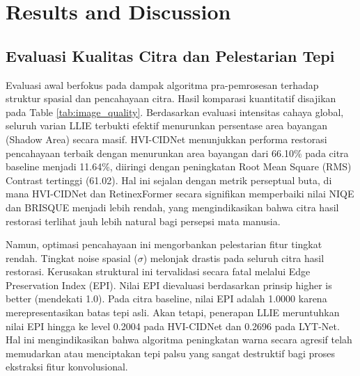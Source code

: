 \documentclass[conference]{IEEEtran}
\begin{document}
\section{Results and Discussion}
\subsection{Evaluasi Kualitas Citra dan Pelestarian Tepi}
Evaluasi awal berfokus pada dampak algoritma pra-pemrosesan terhadap struktur spasial dan pencahayaan citra. Hasil komparasi kuantitatif disajikan pada Table \ref{tab:image_quality}. Berdasarkan evaluasi intensitas cahaya global, seluruh varian LLIE terbukti efektif menurunkan persentase area bayangan (Shadow Area) secara masif. HVI-CIDNet menunjukkan performa restorasi pencahayaan terbaik dengan menurunkan area bayangan dari 66.10\% pada citra baseline menjadi 11.64\%, diiringi dengan peningkatan Root Mean Square (RMS) Contrast tertinggi (61.02). Hal ini sejalan dengan metrik perseptual buta, di mana HVI-CIDNet dan RetinexFormer secara signifikan memperbaiki nilai NIQE dan BRISQUE menjadi lebih rendah, yang mengindikasikan bahwa citra hasil restorasi terlihat jauh lebih natural bagi persepsi mata manusia.

Namun, optimasi pencahayaan ini mengorbankan pelestarian fitur tingkat rendah. Tingkat noise spasial ($\sigma$) melonjak drastis pada seluruh citra hasil restorasi. Kerusakan struktural ini tervalidasi secara fatal melalui Edge Preservation Index (EPI). Nilai EPI dievaluasi berdasarkan prinsip higher is better (mendekati 1.0). Pada citra baseline, nilai EPI adalah 1.0000 karena merepresentasikan batas tepi asli. Akan tetapi, penerapan LLIE meruntuhkan nilai EPI hingga ke level 0.2004 pada HVI-CIDNet dan 0.2696 pada LYT-Net. Hal ini mengindikasikan bahwa algoritma peningkatan warna secara agresif telah memudarkan atau menciptakan tepi palsu yang sangat destruktif bagi proses ekstraksi fitur konvolusional.
\end{document}

